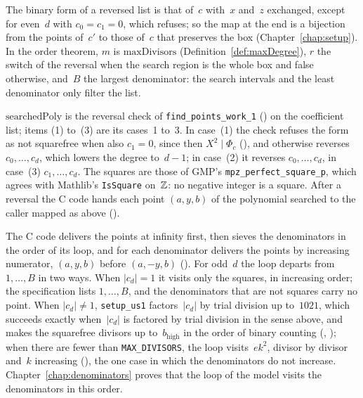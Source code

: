 The binary form of a reversed list is that of~$c$ with~$x$ and~$z$ exchanged, except for even~$d$
with $c_0 = c_1 = 0$, which \ratpoints{} refuses; so the map at the end is a bijection from the points
of~$c'$ to those of~$c$ that preserves the box (Chapter~\ref{chap:setup}). In the order theorem,
$m$ is $\mathrm{maxDivisors}$ (Definition~\ref{def:maxDegree}), $r$ the switch of the reversal when
the search region is the whole box and false otherwise, and~$B$ the largest denominator: the search
intervals and the least denominator only filter the list.

\begin{remark}\label{rem:orderC}
  $\mathrm{searchedPoly}$ is the reversal check of \verb|find_points_work_1|
  () on the coefficient list; items (1) to~(3) are its cases~1
  to~3. In case~(1) the check refuses the form as not squarefree when also $c_1 = 0$, since then
  $X^2 \mid \Phi_c$ (), and otherwise reverses $c_0, \dots, c_d$,
  which lowers the degree to~$d - 1$; in case~(2) it reverses $c_0, \dots, c_d$, in case~(3)
  $c_1, \dots, c_d$. The squares are those of GMP's \verb|mpz_perfect_square_p|, which agrees with
  Mathlib's \verb|IsSquare| on~$\mathbb{Z}$: no negative integer is a square. After a reversal the C code
  hands each point $(a, y, b)$ of the polynomial searched to the caller mapped as above
  ().

  The C code delivers the points at infinity first, then sieves the denominators in the order of its
  loop, and for each denominator delivers the points by increasing numerator, $(a, y, b)$ before
  $(a, -y, b)$ (). For odd~$d$ the loop departs from
  $1, \dots, B$ in two ways. When $|c_d| = 1$ it visits only the squares, in increasing order; the
  specification lists $1, \dots, B$, and the denominators that are not squares carry no point. When
  $|c_d| \ne 1$, \verb|setup_us1| factors~$|c_d|$ by trial division up to~$1021$, which succeeds
  exactly when~$|c_d|$ is factored by trial division in the sense above, and makes the squarefree
  divisors up to~$b_{\mathrm{high}}$ in the order of binary counting
  (, ); when there are fewer than
  \verb|MAX_DIVISORS|, the loop visits~$e k^2$, divisor by divisor and~$k$ increasing
  (), the one case in which the denominators do not increase.
  Chapter~\ref{chap:denominators} proves that the loop of the model visits the denominators in this
  order.
\end{remark}

